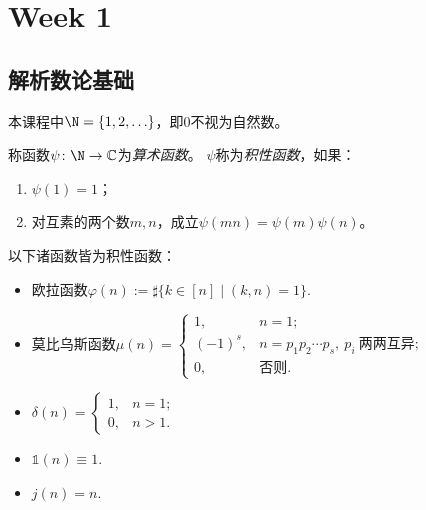 \newcommand{\C}{\mathbb{C}}
\newcommand{\1}{\mathbb{1}}
\newcommand{\Q}{\mathbb{Q}}
\section{Week 1}
\subsection{解析数论基础}
\begin{remark}
    本课程中$\N = \{1,2,\ldots\}$，即$0$不视为自然数。
\end{remark}
\begin{definition}
    称函数$\psi \colon \N \to \C$为\emph{算术函数}。
    $\psi$称为\emph{积性函数}，如果：
    \begin{enumerate}
        \item $\psi(1) = 1$；
        \item 对互素的两个数$m,n$，成立$\psi(mn) = \psi(m)\psi(n)$。
    \end{enumerate}
\end{definition}
\begin{example}
    以下诸函数皆为积性函数：
    \begin{itemize}
        \item 欧拉函数$\varphi(n):= \sharp\{k \in [n] \mid (k,n) = 1\}$.
        \item 莫比乌斯函数$\mu(n) = \begin{cases}
            1 ,& n=1;\\
            (-1)^s ,& n=p_1p_2\cdots p_s,\: p_i\: \text{两两互异};\\
            0 ,& \text{否则}.
        \end{cases}$
        \item $\delta(n) = \begin{cases}
            1, &n = 1;\\
            0, &n > 1.
        \end{cases}$
        \item $\1(n) \equiv 1$.
        \item $j(n) = n$.
    \end{itemize}
\end{example}
